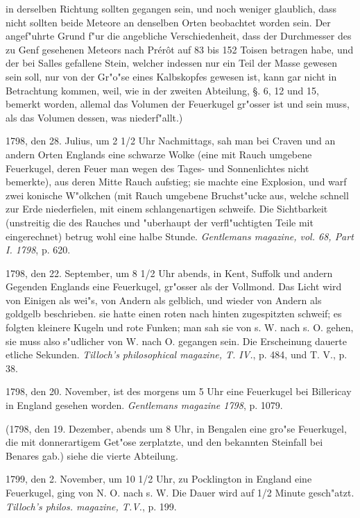 \documentclass[a4paper, 11pt, oneside, polutonikogreek, german]{article}
\begin{document}
in derselben Richtung sollten gegangen sein, und noch weniger glaublich, dass nicht sollten beide Meteore an denselben Orten beobachtet worden sein. Der angef"uhrte Grund f"ur die angebliche Verschiedenheit, dass der Durchmesser des zu Genf gesehenen Meteors nach Prérôt auf 83 bis 152 Toisen betragen habe, und der bei Salles gefallene Stein, welcher indessen nur ein Teil der Masse gewesen sein soll, nur von der Gr"o"se eines Kalbskopfes gewesen ist, kann gar nicht in Betrachtung kommen, weil, wie in der zweiten Abteilung, §. 6, 12 und 15, bemerkt worden, allemal das Volumen der Feuerkugel gr"osser ist und sein muss, als das Volumen dessen, was niederf"allt.)

1798, den 28. Julius, um 2 1/2 Uhr Nachmittags, sah man bei Craven und an andern Orten Englands eine schwarze Wolke (eine mit Rauch umgebene Feuerkugel, deren Feuer man wegen des Tages- und Sonnenlichtes nicht bemerkte), aus deren Mitte Rauch aufstieg; sie machte eine Explosion, und warf zwei konische W"olkchen (mit Rauch umgebene Bruchst"ucke aus, welche schnell zur Erde niederfielen, mit einem schlangenartigen schweife. Die Sichtbarkeit (unstreitig die des Rauches und "uberhaupt der verfl"uchtigten Teile mit eingerechnet) betrug wohl eine halbe Stunde. \emph{Gentlemans magazine, vol. 68, Part I. 1798}, p. 620.

1798, den 22. September, um 8 1/2 Uhr abends, in Kent, Suffolk und andern Gegenden Englands eine Feuerkugel, gr"osser als der Vollmond. Das Licht wird von Einigen als wei"s, von Andern als gelblich, und wieder von Andern als goldgelb beschrieben. sie hatte einen roten nach hinten zugespitzten schweif; es folgten kleinere Kugeln und rote Funken; man sah sie von s. W. nach s. O. gehen, sie muss also s"udlicher von W. nach O. gegangen sein. Die Erscheinung dauerte etliche Sekunden. \emph{Tilloch's philosophical magazine, T. IV.}, p. 484, und T. V., p. 38.

1798, den 20. November, ist des morgens um 5 Uhr eine Feuerkugel bei Billericay in England gesehen worden. \emph{Gentlemans magazine 1798}, p. 1079.

(1798, den 19. Dezember, abends um 8 Uhr, in Bengalen eine gro"se Feuerkugel, die mit donnerartigem Get"ose zerplatzte, und den bekannten Steinfall bei Benares gab.) siehe die vierte Abteilung.

1799, den 2. November, um 10 1/2 Uhr, zu Pocklington in England eine Feuerkugel, ging von N. O. nach s. W. Die Dauer wird auf 1/2 Minute gesch"atzt. \emph{Tilloch's philos. magazine, T.V.}, p. 199.
\end{document}

